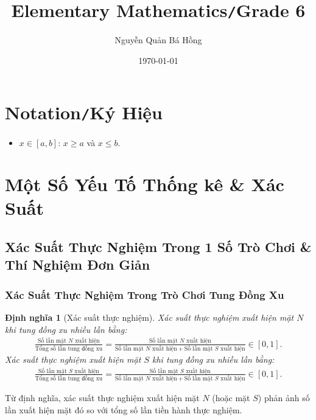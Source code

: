 \documentclass{article}
\title{Elementary Mathematics\texttt{/}Grade 6}
\author{Nguyễn Quản Bá Hồng}
\date{\today}
\numberwithin{equation}{section}
\newtheorem{definition}{Định nghĩa}[section]
\begin{document}
\maketitle
\begin{abstract}
	
\end{abstract}
\tableofcontents


\section*{Notation\texttt{/}Ký Hiệu}
\begin{itemize}
	\item $x\in[a,b]$: $x\ge a$ và $x\le b$.
\end{itemize}

\section{Một Số Yếu Tố Thống kê \& Xác Suất}

\subsection{Xác Suất Thực Nghiệm Trong 1 Số Trò Chơi \& Thí Nghiệm Đơn Giản}

\subsubsection{Xác Suất Thực Nghiệm Trong Trò Chơi Tung Đồng Xu}
\begin{definition}[Xác suất thực nghiệm]
	\emph{Xác suất thực nghiệm xuất hiện mặt $N$} khi tung đồng xu nhiều lần bằng:
	\begin{align*}
		\frac{\mbox{Số lần mặt $N$ xuất hiện}}{\mbox{Tổng số lần tung đồng xu}} = \frac{\mbox{Số lần mặt $N$ xuất hiện}}{\mbox{Số lần mặt $N$ xuất hiện} + \mbox{Số lần mặt $S$ xuất hiện}}\in[0,1].
	\end{align*}
	\emph{Xác suất thực nghiệm xuất hiện mặt $S$} khi tung đồng xu nhiều lần bằng:
	\begin{align*}
		\frac{\mbox{Số lần mặt $S$ xuất hiện}}{\mbox{Tổng số lần tung đồng xu}} = \frac{\mbox{Số lần mặt $S$ xuất hiện}}{\mbox{Số lần mặt $N$ xuất hiện} + \mbox{Số lần mặt $S$ xuất hiện}}\in[0,1].
	\end{align*}
\end{definition}
Từ định nghĩa, xác suất thực nghiệm xuất hiện mặt $N$ (hoặc mặt $S$) phản ảnh số lần xuất hiện mặt đó so với tổng số lần tiền hành thực nghiệm.
\end{document}
